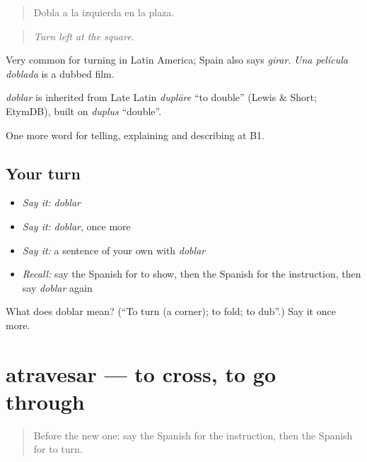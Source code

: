 \begin{quote}
Dobla a la izquierda en la plaza.
\end{quote}

\begin{quote}
\emph{Turn left at the square.}
\end{quote}

Very common for turning in Latin America; Spain also says \emph{girar}. \emph{Una película doblada} is a dubbed film.

\begin{cousinweb}
\emph{doblar} is inherited from Late Latin \emph{duplāre} \textquotedblleft{}to double\textquotedblright{} (Lewis \& Short; EtymDB), built on \emph{duplus} \textquotedblleft{}double\textquotedblright{}.
\end{cousinweb}

\begin{grammarlens}[title={What you've built}]
One more word for telling, explaining and describing at B1.
\end{grammarlens}

\subsection*{Your turn}
\begin{itemize}
\raggedright
  \item \emph{Say it:} \emph{doblar}
  \item \emph{Say it:} \emph{doblar}, once more
  \item \emph{Say it:} a sentence of your own with \emph{doblar}
  \item \emph{Recall:} say the Spanish for to show, then the Spanish for the instruction, then say \emph{doblar} again
\end{itemize}

\begin{tcolorbox}[breakable,colback=teal!4,colframe=teal!35!black,title={Before you move on}]
What does doblar mean? (\textquotedblleft{}To turn (a corner); to fold; to dub\textquotedblright{}.) Say it once more.
\end{tcolorbox}
\section[atravesar]{atravesar — to cross, to go through}

\label{lesson:ES-C670-atravesar}



\begin{quote}
Before the new one: say the Spanish for the instruction, then the Spanish for to turn.
\end{quote}

